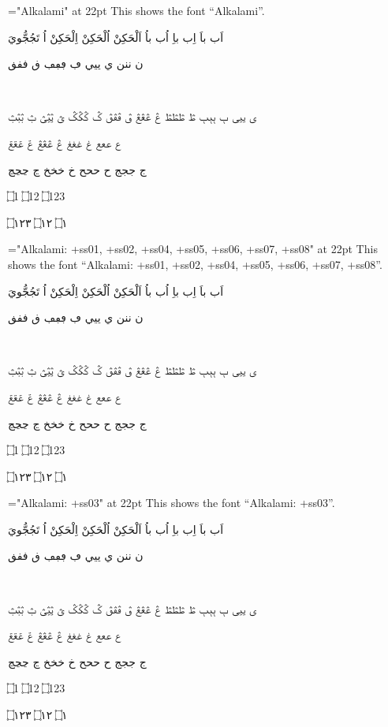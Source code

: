 

\vsize=9.5in
\nopagenumbers
\parindent=0pt
\def\testFont#1{
  \font\x="#1" at 22pt \x
    This shows the font “#1”. \par\touching\par\warsh\par\imala\par\wagaf\par\ain\par\jeem\par\endayahA\par\endayahB\par}

\baselineskip=20pt

\def\warsh{\beginR  ن ننن      ي ييي      ڢ ڢڢڢ      ڧ ڧڧڧ \endR} %
\def\touching{\beginR اَب باَ  اِب باِ اُب باُ  اَلْحَكِنْ اُلْحَكِنْ اِلْحَكِنْ  اُ تَجُجُّويَ  \endR} %
\def\endayahA{\beginR ۝1   ۝12   ۝123   \endR} %
\def\endayahB{\beginR ۝١   ۝١٢   ۝١٢٣ \endR} %
\def\imala{\beginR بٜ  \endR} %
\def\wagaf{\beginR ی ییی      ٻ ٻٻٻ  ڟ ڟڟڟ  ڠ ڠڠڠ    ڨ ڨڨڨ    ݣ ݣݣݣ ؿ ؿؿؿ ݑ ݑݑݑ \endR} %
\def\ain{\beginR  ع ععع غ غغغ ڠ ڠڠڠ ݝ ݝݝݝ  \endR} %
\def\jeem{\beginR ج ججج ح ححح خ خخخ ڃ ڃڃڃ   \endR} %
\def\lamalef{\beginR لإ ‍لإ لَإِ ‍لَإِ لأ ‍لأ لَأَ ‍لَأَ لإ ‍لإ لَإِ ‍لَإِ لأ ‍لأ لَأَ ‍لَأَ لآ ‍لآ لَآَ ‍لَآَ لا ‍لا لَاَ ‍لَاَ \endR} 
\bigskip


\testFont{Alkalami}

\bigskip

\testFont{Alkalami:
       +ss01, +ss02, +ss04, +ss05, +ss06, +ss07, +ss08}

\bigskip

\testFont{Alkalami:
       +ss03}

\bigskip


\bigskip

\bye

